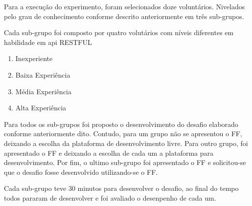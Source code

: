 Para a execução do experimento, foram selecionados doze voluntários. Nivelados pelo grau de
conhecimento conforme descrito anteriormente em três sub-grupos.

Cada sub-grupo foi composto por quatro volutários com níveis diferentes em habilidade em api RESTFUL
  \begin{enumerate}
    \item Inexperiente
    \item Baixa Experiência
    \item Média Experiência
    \item Alta Experiência
  \end{enumerate}


Para todos os sub-grupos foi proposto o desenvolvimento do desafio elaborado conforme anteriormente dito. Contudo,
para um grupo não se apresentou o FF, deixando a escolha da plataforma de desenvolvimento livre. Para outro grupo,
foi apresentado o FF e deixando a escolha de cada um a plataforma para desenvolvimento. Por fim, o ultimo sub-grupo
foi apresentado o FF e solicitou-se que o desafio fosse desenvolvido utilizando-se o FF.

Cada sub-grupo teve 30 minutos para desenvolver o desafio, ao final do tempo todos pararam de desenvolver
e foi avaliado o desenpenho de cada um.
